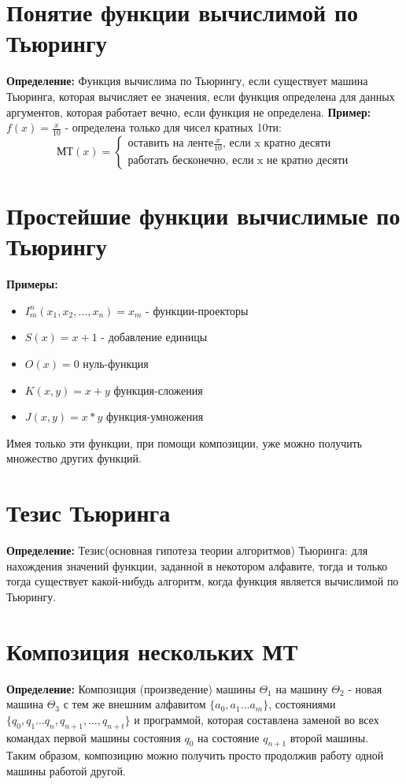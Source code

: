 \documentclass[../main.tex]{subfiles}
\begin{document}
\section{Понятие функции вычислимой по Тьюрингу}
\textbf{Определение:
} Функция вычислима по Тьюрингу, если существует машина Тьюринга, которая вычисляет ее значения, если функция определена для данных аргументов, которая работает вечно, если функция не определена.
\textbf{Пример:
} $f(x)=\frac{x}{10}$ - определена только для чисел кратных 10ти: 
\begin{equation*}
    \text{МТ} (x) = 
    \begin{cases}
		\text{оставить на ленте} \frac{x}{10} \text{, если x кратно десяти}\\
        \text{работать бесконечно}\text{, если x не кратно десяти}
    \end{cases}
\end{equation*}

\section{Простейшие функции вычислимые по Тьюрингу}
\textbf{Примеры:
} \begin{itemize}
	\item $I_m^n(x_1,x_2,\ldots,x_n)=x_m$ - функции-проекторы
	\item $S(x) = x + 1$ - добавление единицы
	\item $O(x) = 0$ нуль-функция 
	\item $K(x, y) = x+y$ функция-сложения
	\item $J(x, y) = x*y$ функция-умножения
\end{itemize} 
Имея только эти функции, при помощи композиции, уже можно получить множество других функций.

\section{Тезис Тьюринга}
\textbf{Определение:
} Тезис(основная гипотеза теории алгоритмов) Тьюринга: для нахождения значений функции, заданной в некотором алфавите, тогда и только тогда существует какой-нибудь алгоритм, когда функция является вычислимой по Тьюрингу.

\section{Композиция нескольких МТ}
\textbf{Определение:
} Композиция (произведение) машины $\Theta_1$ на машину $\Theta_2$ - новая машина $\Theta_3$ с тем же внешним алфавитом $\{a_0,a_1 \ldots a_m\}$, состояниями $\{q_0,q_1 \ldots q_n,q_{n+1},\ldots,q_{n+t}\}$ и программой, которая составлена заменой во всех командах первой машины состояния $q_0$ на состояние $q_{n+1}$ второй машины. \\
Таким образом, композицию можно получить просто продолжив работу одной машины работой другой.
\end{document}
